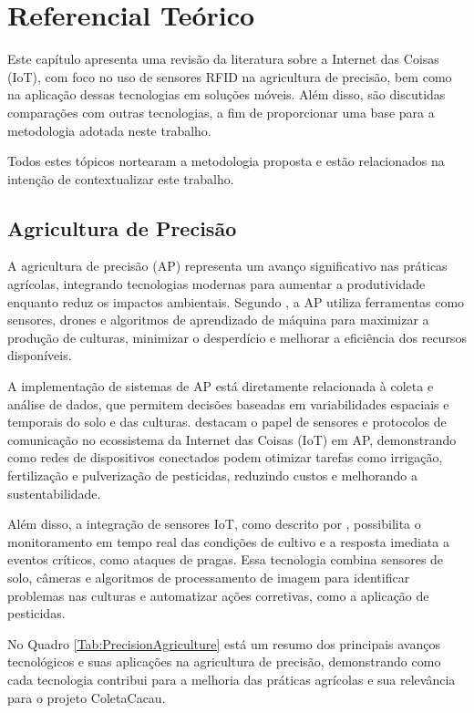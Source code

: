 \chapter{Referencial Teórico}

Este capítulo apresenta uma revisão da literatura sobre a Internet das Coisas (IoT), com foco no uso de sensores RFID na agricultura de precisão, bem como na aplicação dessas tecnologias em soluções móveis. Além disso, são discutidas comparações com outras tecnologias, a fim de proporcionar uma base para a metodologia adotada neste trabalho.

Todos estes tópicos nortearam a metodologia proposta e estão relacionados na intenção de contextualizar este trabalho.

\section{Agricultura de Precisão}
A agricultura de precisão (AP) representa um avanço significativo nas práticas agrícolas, integrando tecnologias modernas para aumentar a produtividade enquanto reduz os impactos ambientais. Segundo \cite{Marinello2023ThePT}, a AP utiliza ferramentas como sensores, drones e algoritmos de aprendizado de máquina para maximizar a produção de culturas, minimizar o desperdício e melhorar a eficiência dos recursos disponíveis.

A implementação de sistemas de AP está diretamente relacionada à coleta e análise de dados, que permitem decisões baseadas em variabilidades espaciais e temporais do solo e das culturas. \cite{Chapungo2021SensorsAC} destacam o papel de sensores e protocolos de comunicação no ecossistema da Internet das Coisas (IoT) em AP, demonstrando como redes de dispositivos conectados podem otimizar tarefas como irrigação, fertilização e pulverização de pesticidas, reduzindo custos e melhorando a sustentabilidade.

Além disso, a integração de sensores IoT, como descrito por \cite{MohamedArafathRajack2021ImplementationOI}, possibilita o monitoramento em tempo real das condições de cultivo e a resposta imediata a eventos críticos, como ataques de pragas. Essa tecnologia combina sensores de solo, câmeras e algoritmos de processamento de imagem para identificar problemas nas culturas e automatizar ações corretivas, como a aplicação de pesticidas.

No Quadro \ref{Tab:PrecisionAgriculture} está um resumo dos principais avanços tecnológicos e suas aplicações na agricultura de precisão, demonstrando como cada tecnologia contribui para a melhoria das práticas agrícolas e sua relevância para o projeto ColetaCacau.

